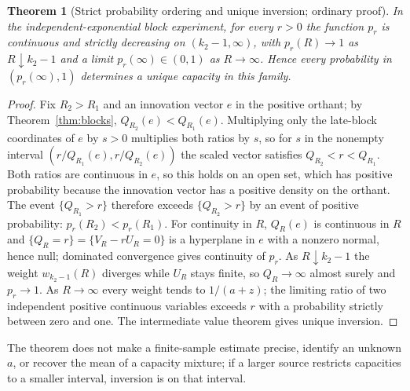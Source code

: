 \documentclass[11pt,a4paper]{article}
\theoremstyle{plain}
\newtheorem{theorem}{Theorem}[section]
\theoremstyle{definition}
\theoremstyle{remark}
\begin{document}
\begin{theorem}[Strict probability ordering and unique inversion; ordinary proof]\label{thm:strict}
In the independent-exponential block experiment, for every $r>0$ the function $p_r$ is continuous and strictly decreasing on $(k_2-1,\infty)$, with $p_r(R)\to1$ as $R\downarrow k_2-1$ and a limit $p_r(\infty)\in(0,1)$ as $R\to\infty$. Hence every probability in $(p_r(\infty),1)$ determines a unique capacity in this family.
\end{theorem}
\begin{proof}
Fix $R_2>R_1$ and an innovation vector $e$ in the positive orthant; by Theorem~\ref{thm:blocks}, $Q_{R_2}(e)<Q_{R_1}(e)$. Multiplying only the late-block coordinates of $e$ by $s>0$ multiplies both ratios by $s$, so for $s$ in the nonempty interval $(r/Q_{R_1}(e),r/Q_{R_2}(e))$ the scaled vector satisfies $Q_{R_2}<r<Q_{R_1}$. Both ratios are continuous in $e$, so this holds on an open set, which has positive probability because the innovation vector has a positive density on the orthant. The event $\{Q_{R_1}>r\}$ therefore exceeds $\{Q_{R_2}>r\}$ by an event of positive probability: $p_r(R_2)<p_r(R_1)$. For continuity in $R$, $Q_R(e)$ is continuous in $R$ and $\{Q_R=r\}=\{V_R-rU_R=0\}$ is a hyperplane in $e$ with a nonzero normal, hence null; dominated convergence gives continuity of $p_r$. As $R\downarrow k_2-1$ the weight $w_{k_2-1}(R)$ diverges while $U_R$ stays finite, so $Q_R\to\infty$ almost surely and $p_r\to1$. As $R\to\infty$ every weight tends to $1/(a+z)$; the limiting ratio of two independent positive continuous variables exceeds $r$ with a probability strictly between zero and one. The intermediate value theorem gives unique inversion.
\end{proof}
The theorem does not make a finite-sample estimate precise, identify an unknown $a$, or recover the mean of a capacity mixture; if a larger source restricts capacities to a smaller interval, inversion is on that interval.
\end{document}
